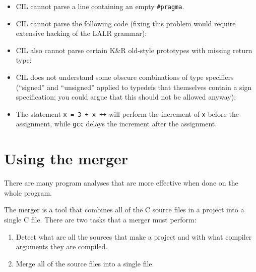 \documentclass{article}
\def\t#1{{\tt #1}}
\begin{document}
\begin{itemize}
\item CIL cannot parse a line containing an empty \t{\#pragma}.

\item CIL cannot parse the following code (fixing this problem would require
extensive hacking of the LALR grammar):

\item CIL also cannot parse certain K\&R old-style prototypes with missing
return type:

\item CIL does not understand some obscure combinations of type specifiers
(``signed'' and ``unsigned'' applied to typedefs that themselves contain a
sign specification; you could argue that this should not be allowed anyway):

\item The statement \t{x = 3 + x ++} will perform the increment of \t{x}
  before the assignment, while \t{gcc} delays the increment after the
  assignment. 
\end{itemize}

  \section{Using the merger}\label{sec-merger}

 There are many program analyses that are more effective when
done on the whole program.

 The merger is a tool that combines all of the C source files in a project
into a single C file. There are two tasks that a merger must perform:
\begin{enumerate}
\item Detect what are all the sources that make a project and with what
compiler arguments they are compiled.

\item Merge all of the source files into a single file. 
\end{enumerate}
\end{document}

